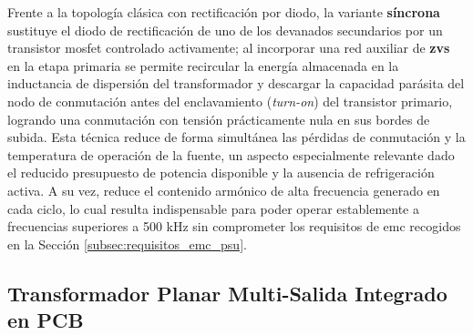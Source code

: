 Frente a la topología  clásica con rectificación por diodo, la variante \textbf{síncrona} sustituye el diodo de rectificación de uno de los devanados secundarios por un transistor \gls{mosfet} controlado activamente; al incorporar una red auxiliar de \textbf{\gls{zvs}} en la etapa primaria se permite recircular la energía almacenada en la inductancia de dispersión del transformador y descargar la capacidad parásita del nodo de conmutación antes del enclavamiento (\textit{turn-on}) del transistor primario, logrando una conmutación con tensión prácticamente nula en sus bordes de subida. Esta técnica reduce de forma simultánea las pérdidas de conmutación y la temperatura de operación de la fuente, un aspecto especialmente relevante dado el reducido presupuesto de potencia disponible y la ausencia de refrigeración activa. A su vez, reduce el contenido armónico de alta frecuencia generado en cada ciclo, lo cual resulta indispensable para poder operar establemente a frecuencias superiores a 500 kHz sin comprometer los requisitos de \gls{emc} recogidos en la Sección \ref{subsec:requisitos_emc_psu}.




\subsection{Transformador Planar Multi-Salida Integrado en PCB}
\label{subsec:transformador_planar}


